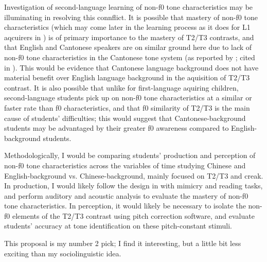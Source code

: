 \documentclass[11pt]{article}
\begin{document}
Investigation of second-language learning of non-f0 tone characteristics may be illuminating in resolving this connflict. It is possible that mastery of non-f0 tone characteristics (which may come later in the learning process as it does for L1 aqcuirers in \cite{rhee_going_2021}) is of primary importance to the mastery of T2/T3 contrasts, and that English and Cantonese speakers are on similar ground here due to lack of non-f0 tone characteristics in the Cantonese tone system (as reported by \cite{mok_assessing_2019}; cited in \cite{rose_variation_2020}). This would be evidence that Cantonese language background does not have material benefit over English language background in the aquisition of T2/T3 contrast.  It is also possible that unlike for first-language aquiring children, second-language students pick up on non-f0 tone characteristics at a similar or faster rate than f0 characteristics, and that f0 similarity of T2/T3 is the main cause of students' difficulties; this would suggest that Cantonese-background students may be advantaged by their greater f0 awareness compared to English-background students.

Methodologically, I would be comparing students' production and perception of non-f0 tone characteristics across the variables of time studying Chinese and English-background vs. Chinese-background, mainly focused on T2/T3 and creak. In production,  I would likely follow the design in \textcite{hao_second_2012} with mimicry and reading tasks, and perform auditory and acoustic analysis to evaluate the mastery of non-f0 tone characteristics. In perception, it would likely be necessary to isolate the non-f0 elements of the T2/T3 contrast using pitch correction software, and evaluate students' accuracy at tone identification on these pitch-constant stimuli.

This proposal is my number 2 pick; I find it interesting, but a little bit less exciting than my sociolinguistic idea.

\printbibliography
\end{document}
